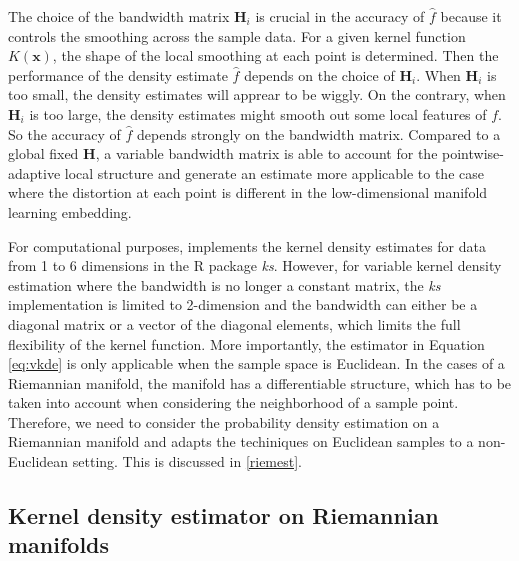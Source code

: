 \documentclass[11pt,a4paper,]{article}
\begin{document}
The choice of the bandwidth matrix \(\pmb{H}_i\) is crucial in the accuracy of \(\hat{f}\) because it controls the smoothing across the sample data. For a given kernel function \(K(\pmb{x})\), the shape of the local smoothing at each point is determined. Then the performance of the density estimate \(\hat{f}\) depends on the choice of \(\pmb{H}_i\). When \(\pmb{H}_i\) is too small, the density estimates will apprear to be wiggly. On the contrary, when \(\pmb{H}_i\) is too large, the density estimates might smooth out some local features of \(f\). So the accuracy of \(\hat{f}\) depends strongly on the bandwidth matrix.
Compared to a global fixed \(\pmb{H}\), a variable bandwidth matrix is able to account for the pointwise-adaptive local structure and generate an estimate more applicable to the case where the distortion at each point is different in the low-dimensional manifold learning embedding.

For computational purposes, \textcite{Duong2007-up} implements the kernel density estimates for data from 1 to 6 dimensions in the R package \emph{ks}.
However, for variable kernel density estimation where the bandwidth is no longer a constant matrix, the \emph{ks} implementation is limited to 2-dimension and the bandwidth can either be a diagonal matrix or a vector of the diagonal elements, which limits the full flexibility of the kernel function.
More importantly, the estimator in Equation \eqref{eq:vkde} is only applicable when the sample space is Euclidean. In the cases of a Riemannian manifold, the manifold has a differentiable structure, which has to be taken into account when considering the neighborhood of a sample point. Therefore, we need to consider the probability density estimation on a Riemannian manifold and adapts the techiniques on Euclidean samples to a non-Euclidean setting. This is discussed in \autoref{riemest}.

\hypertarget{riemest}{%
\subsection{Kernel density estimator on Riemannian manifolds}\label{riemest}}
\end{document}
